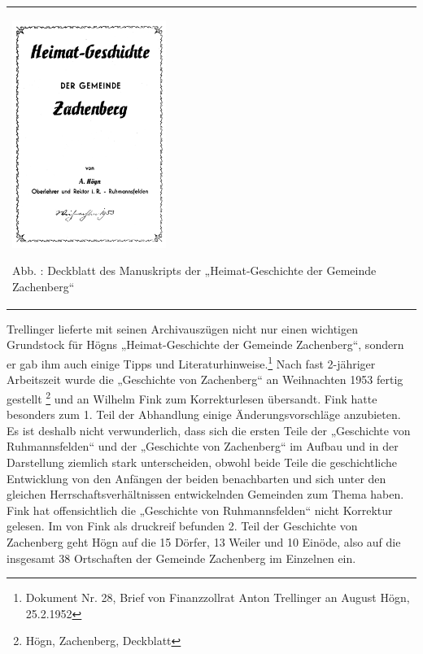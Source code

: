\begin{center}
\begin{minipage}{5.378cm}
\begin{flushleft}
\tablefirsthead{}
\tablehead{}
\tabletail{}
\tablelasttail{}
\begin{supertabular}{m{5.178cm}}

\includegraphics[width=4.995cm,height=7.405cm]{pictures/zulassungsarbeit-img043.png}

Abb. : Deckblatt des Manuskripts der
„Heimat-Geschichte der Gemeinde Zachenberg“\\
\end{supertabular}
\end{flushleft}
\end{minipage}
\end{center}
Trellinger lieferte mit seinen Archivauszügen nicht nur einen wichtigen
Grundstock für Högns „Heimat-Geschichte der Gemeinde Zachenberg“,
sondern er gab ihm auch einige Tipps und Literaturhinweise.\footnote{
Dokument Nr. 28, Brief von Finanzzollrat Anton Trellinger an August
Högn, 25.2.1952} Nach fast 2-jähriger Arbeitszeit wurde die „Geschichte
von Zachenberg“ an Weihnachten 1953 fertig gestellt \footnote{Högn,
Zachenberg, Deckblatt} und an Wilhelm Fink zum Korrekturlesen
übersandt. Fink hatte besonders zum 1. Teil der Abhandlung einige
Änderungsvorschläge anzubieten. Es ist deshalb nicht verwunderlich,
dass sich die ersten Teile der „Geschichte von Ruhmannsfelden“ und der
„Geschichte von Zachenberg“ im Aufbau und in der Darstellung ziemlich
stark unterscheiden, obwohl beide Teile die geschichtliche Entwicklung
von den Anfängen der beiden benachbarten und sich unter den gleichen
Herrschaftsverhältnissen entwickelnden Gemeinden zum Thema haben. Fink
hat offensichtlich die „Geschichte von Ruhmannsfelden“ nicht Korrektur
gelesen. Im von Fink als druckreif befunden 2. Teil der Geschichte von
Zachenberg geht Högn auf die 15 Dörfer, 13 Weiler und 10 Einöde, also
auf die insgesamt 38 Ortschaften der Gemeinde Zachenberg im Einzelnen
ein.


